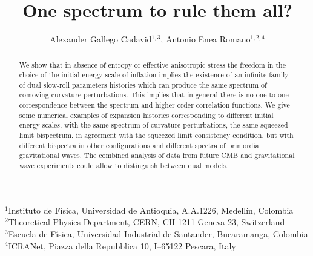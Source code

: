 \documentclass[aps,prl,amsmath,nofootinbib,twocolumn]{revtex4}
\newcommand{\3}{\partial}
\newcommand{\4}{\frac}
\newcommand{\5}{\delta}
\renewcommand\({\left(}
\renewcommand\){\right)}
\renewcommand\[{\left[}
\renewcommand\]{\right]}
\begin{document}
\title{One spectrum to rule them all?}

\author{Alexander Gallego Cadavid$^{1,3}$, Antonio Enea Romano$^{1,2,4}$ 
}
\affiliation
{
${}^{1}$Instituto de F\'isica, Universidad de Antioquia, A.A.1226, Medell\'in, Colombia\\
${}^{2}${Theoretical Physics Department, CERN, CH-1211 Geneva 23, Switzerland}\\
${}^{3}$Escuela de F\'isica, Universidad Industrial de Santander, Bucaramanga, Colombia\\
${}^{4}$ICRANet, Piazza della Repubblica 10, I--65122 Pescara, Italy \\
}
\begin{abstract}
We show that in absence of entropy or effective anisotropic stress the freedom in the choice of the initial energy scale of inflation implies the existence of an infinite family of dual slow-roll parameters histories which can produce the same spectrum of comoving curvature perturbations.  
This  implies that in general there is no one-to-one correspondence between the spectrum and higher order correlation functions.
We give some  numerical examples of expansion histories corresponding to different initial energy scales, with the same spectrum of curvature perturbations, the same squeezed limit bispectrum, in agreement with the squeezed limit consistency condition, but with different bispectra in other configurations and different spectra of primordial gravitational waves. The combined analysis of data from future CMB and gravitational wave experiments could allow to distinguish between dual models.
\end{abstract}

\maketitle
\end{document}
